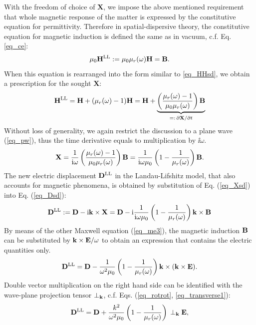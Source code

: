 With the freedom of choice of $\mathbf{X}$, we impose the above mentioned requirement that whole magnetic response of the matter is expressed by the constitutive equation for permittivity. Therefore in spatial-dispersive theory, the constitutive equation 
for magnetic induction is defined the same as in vacuum, c.f. Eq. \ref{eq_ce}:
\begin{equation} \mu_0 {\mathbf{H}^\text{LL}} := \mu_0 \mu_r(\omega) \mathbf{H} = \mathbf{B}. \label{eq_mu_sd}\end{equation}
When this equation is rearranged into the form similar to \ref{eq_HHsd}, we obtain a prescription for the sought $\mathbf{X}$: 
$$ {\mathbf{H}^\text{LL}} = \mathbf{H} + (\mu_r(\omega) -1)\mathbf{H} = \mathbf{H} + \underbrace{\left(\frac{\mu_r(\omega)-1}{\mu_0\mu_r(\omega)}\right)\mathbf{B}}_{=:\,\partial\mathbf{X}/\partial t}$$
Without loss of generality, we again restrict the discussion to a plane wave (\ref{eq_pw}), thus the time derivative equals to multiplication by $\ii\omega$.
\begin{equation} \mathbf{X} = \frac{1}{{\mathrm i}\omega}\left(\frac{\mu_r(\omega)-1}{\mu_0\mu_r(\omega)}\right)\mathbf{B} = \frac{1}{{\mathrm i}\omega\mu_0}\left(1 - \frac{1}{\mu_r(\omega)}\right)\mathbf{B}. \label{eq_Xsd}\end{equation}
The new electric displacement ${\mathbf{D}^\text{LL}}$ in the  Landau-Lifshitz model, that also accounts for magnetic phenomena, is obtained by substitution of Eq. (\ref{eq_Xsd}) into Eq. (\ref{eq_Dsd}):
\begin{equation} {\mathbf{D}^\text{LL}} := \mathbf{D} - {\mathrm i}{\mathbf{k}}\times \mathbf{X} =  \mathbf{D} - {\mathrm i}  \frac{1}{{\mathrm i}\omega\mu_0}\left(1 - \frac{1}{\mu_r(\omega)}\right) {\mathbf{k}}\times \mathbf{B}  \label{eq_Dsd2}\end{equation}
By means of the other Maxwell equation (\ref{eq_me3}), the magnetic induction $\mathbf{B}$ can be substituted by ${\mathbf{k}}\times\mathbf{E} / \omega$ to obtain an expression that contains the electric quantities only.
\begin{equation} {\mathbf{D}^\text{LL}} = \mathbf{D} - \frac{1}{\omega^2 \mu_0}\left(1 - \frac{1}{\mu_r(\omega)}\right) {\mathbf{k}}\times({\mathbf{k}}\times \mathbf{E}).  \label{eq_Dsd3}\end{equation} 
Double vector multiplication on the right hand side can be identified with the wave-plane projection tensor $\perp_{\mathbf{k}}$, c.f. Eqs. (\ref{eq_rotrot}, \ref{eq_transverse1}):
\begin{equation} {\mathbf{D}^\text{LL}} = \mathbf{D} + \frac{k^2}{\omega^2 \mu_0}\left(1 - \frac{1}{\mu_r(\omega)}\right) \, \perp_{\mathbf{k}} \mathbf{E},  \label{eq_Dsd4}\end{equation} 

